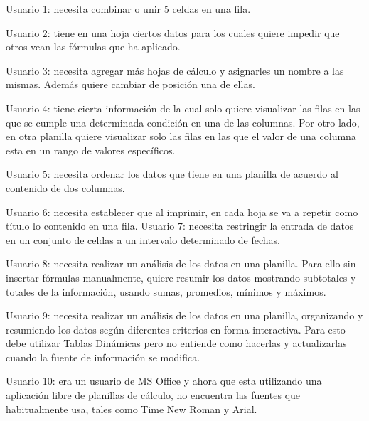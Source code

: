 \documentclass[12pt]{article}
\begin{document}
\begin{description}

    \item{Usuario 1}: necesita combinar o unir 5 celdas en una fila.

    \item{Usuario 2}: tiene en una hoja ciertos datos para los cuales quiere
    impedir que otros vean las fórmulas que ha aplicado.

    \item{Usuario 3}: necesita agregar más hojas de cálculo y asignarles un
    nombre a las mismas. Además quiere cambiar de posición una de ellas.

    \item{Usuario 4}: tiene cierta información de la cual solo quiere
    visualizar las filas en las que se cumple una determinada condición en una
    de las columnas. Por otro lado, en otra planilla quiere visualizar solo
    las filas en las que el valor de una columna esta en un rango de valores
    específicos.

    \item{Usuario 5}: necesita ordenar los datos que tiene en una planilla de
    acuerdo al contenido de dos columnas.

    \item{Usuario 6}: necesita establecer que al imprimir, en cada hoja se va
    a repetir como título lo contenido en una fila.  Usuario 7: necesita
    restringir la entrada de datos en un conjunto de celdas a un intervalo
    determinado de fechas.

    \item{Usuario 8}: necesita realizar un análisis de los datos en una
    planilla. Para ello sin insertar fórmulas manualmente, quiere resumir los
    datos mostrando subtotales y totales de la información, usando sumas,
    promedios, mínimos y máximos.

    \item{Usuario 9}: necesita realizar un análisis de los datos en una
    planilla, organizando y resumiendo los datos según diferentes criterios en
    forma interactiva. Para esto debe utilizar Tablas Dinámicas pero no
    entiende como hacerlas y actualizarlas cuando la fuente de información se
    modifica.

    \item{Usuario 10}: era un usuario de MS Office y ahora que esta utilizando
    una aplicación libre de planillas de cálculo, no encuentra las fuentes que
    habitualmente usa, tales como Time New Roman y Arial.

\end{description}
\end{document}
